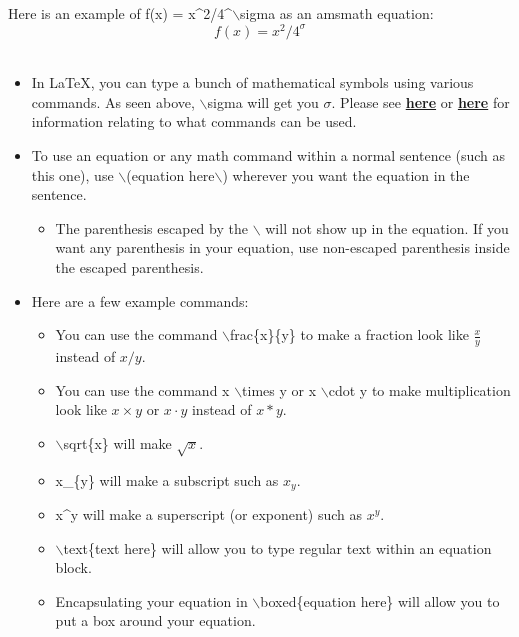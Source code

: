 \documentclass{article}
\begin{document}
		Here is an example of  f(x) = x\string^2/4\string^$\backslash$sigma as an amsmath equation:\\
		\begin{equation*}
			f(x) = x^2/4^\sigma
		\end{equation*}
		\\
		\begin{itemize}
			\item In \LaTeX{}, you can type a bunch of mathematical symbols using various commands. As seen above, $\backslash$sigma will get you \(\sigma\). Please see \href{http://tug.ctan.org/info/undergradmath/undergradmath.pdf}{\textbf{here}} or \href{http://tug.ctan.org/info/short-math-guide/short-math-guide.pdf}{\textbf{here}} for information relating to what commands can be used.
			\item To use an equation or any math command within a normal sentence (such as this one), use $\backslash$(equation here$\backslash$) wherever you want the equation in the sentence.
			\begin{itemize}
				\item The parenthesis escaped by the $\backslash$ will not show up in the equation. If you want any parenthesis in your equation, use non-escaped parenthesis inside the escaped parenthesis.
			\end{itemize}
			\item Here are a few example commands:
			\begin{itemize}
				\item You can use the command $\backslash$frac\{x\}\{y\} to make a fraction look like \(\frac{x}{y}\) instead of \(x/y\).
				\item You can use the command x $\backslash$times y  or x $\backslash$cdot y to make multiplication look like \(x \times y\) or \(x \cdot y\) instead of \(x*y\).
				\item $\backslash$sqrt\{x\} will make \(\sqrt{x}\).
				\item x\_\{y\} will make a subscript such as \(x_{y}\).
				\item x\string^y will make a superscript (or exponent) such as \(x^y\).
				\item $\backslash$text\{text here\} will allow you to type regular text within an equation block.
				\item Encapsulating your equation in $\backslash$boxed\{equation here\} will allow you to put a box around your equation.
			\end{itemize}
		\end{itemize}
\end{document}
